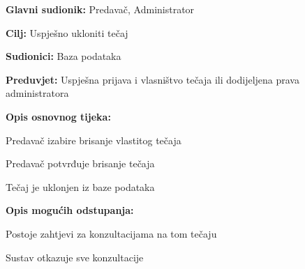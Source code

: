 			\noindent {}
			\begin{packed_item}
				
				\item \textbf{Glavni sudionik:} Predavač, Administrator
				\item  \textbf{Cilj:} Uspješno ukloniti tečaj
				\item  \textbf{Sudionici:} Baza podataka
				\item  \textbf{Preduvjet:} Uspješna prijava i vlasništvo tečaja ili dodijeljena prava administratora
				\item  \textbf{Opis osnovnog tijeka:}
				
				\item[] \begin{packed_enum}
					
					\item Predavač izabire brisanje vlastitog tečaja
					\item Predavač potvrđuje brisanje tečaja
					\item Tečaj je uklonjen iz baze podataka
					
				\end{packed_enum}
				\item  \textbf{Opis mogućih odstupanja:}
				
				\item[] \begin{packed_item}
					
					\item[1.a] Postoje zahtjevi za konzultacijama na tom tečaju
					\item[] \begin{packed_enum}
						
						\item Sustav otkazuje sve konzultacije
						
					\end{packed_enum}
					
				\end{packed_item}
				
			\end{packed_item}
				
